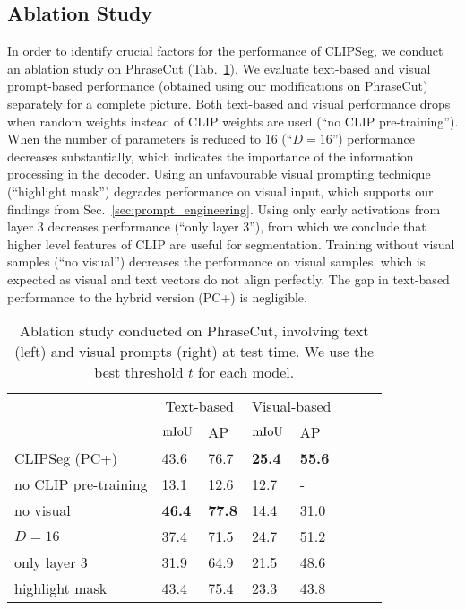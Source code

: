 \subsection{Ablation Study}

In order to identify crucial factors for the performance of CLIPSeg, we conduct an ablation study on PhraseCut (Tab.~\ref{tab:ablation}). We evaluate text-based and visual prompt-based performance (obtained using our modifications on PhraseCut) separately for a complete picture.
Both text-based and visual performance drops when random weights instead of CLIP weights are used (``no CLIP pre-training''). When the number of parameters is reduced to 16 (``$D=16$'') performance decreases substantially, which indicates the importance of the information processing in the decoder.
Using an unfavourable visual prompting technique (``highlight mask'') degrades performance on visual input, which supports our findings from Sec.~\ref{sec:prompt_engineering}. 
Using only early activations from layer 3 decreases performance (``only layer 3''), from which we conclude that higher level features of CLIP are useful for segmentation.
Training without visual samples (``no visual'') decreases the performance on visual samples, which is expected as visual and text vectors do not align perfectly. The gap in text-based performance to the hybrid version (PC+) is negligible.

\begin{table}[t]
    \centering
    \footnotesize
    \begin{tabular}{llllllll}
        \toprule
        & \multicolumn{2}{c}{Text-based} & \multicolumn{2}{c}{Visual-based} \\
         & $\text{mIoU}$ &  AP & $\text{mIoU}$ &  AP   \\
        \midrule
              CLIPSeg (PC+) &  43.6 &  76.7 &  \textbf{25.4} &  \textbf{55.6} \\
 no CLIP pre-training &  13.1 &  12.6 &  12.7 &   - \\
            no visual &  \textbf{46.4} &  \textbf{77.8} &  14.4 &  31.0 \\
                     $D=16$ &  37.4 &  71.5 &  24.7 &  51.2 \\
         only layer 3 &  31.9 &  64.9 &  21.5 &  48.6 \\
       highlight mask &  43.4 &  75.4 &  23.3 &  43.8 \\
        
        \bottomrule
    \end{tabular}
    \caption{Ablation study conducted on PhraseCut, involving text (left) and visual prompts (right) at test time. We use the best threshold $t$ for each model.}
    \label{tab:ablation}
\end{table}

